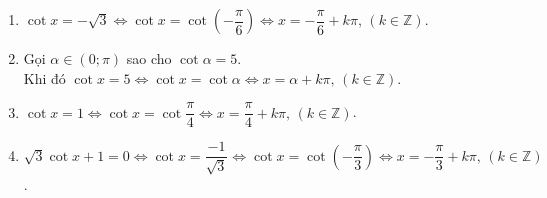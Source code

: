 \begin{bt}
{\begin{enumerate}
			\item $\cot x=-\sqrt{3}\Leftrightarrow\cot x=\cot\left(-\dfrac{\pi}{6}\right)\Leftrightarrow x=-\dfrac{\pi}{6}+k\pi,\,(k\in\mathbb{Z})$.
			\item Gọi $\alpha\in\left(0;\pi\right)$ sao cho $\cot\alpha=5$.\\Khi đó $\cot x=5\Leftrightarrow\cot x=\cot\alpha\Leftrightarrow x=\alpha+k\pi,\,(k\in\mathbb{Z})$.
			\item $\cot x=1\Leftrightarrow\cot x=\cot\dfrac{\pi}{4}\Leftrightarrow x=\dfrac{\pi}{4}+k\pi,\,(k\in\mathbb{Z})$.
			\item $\sqrt{3}\cot x+1=0\Leftrightarrow\cot x=\dfrac{-1}{\sqrt{3}}\Leftrightarrow\cot x=\cot\left(-\dfrac{\pi}{3}\right)\Leftrightarrow x=-\dfrac{\pi}{3}+k\pi,\,(k\in\mathbb{Z})$.
	\end{enumerate}}
\end{bt}

